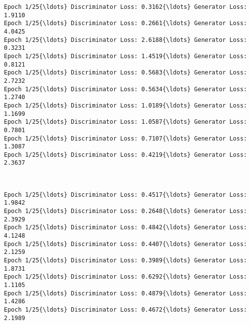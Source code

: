 \documentclass[11pt]{article}
\begin{document}
    \begin{Verbatim}[commandchars=\\\{\}]
Epoch 1/25{\ldots} Discriminator Loss: 0.3162{\ldots} Generator Loss: 1.9110
Epoch 1/25{\ldots} Discriminator Loss: 0.2661{\ldots} Generator Loss: 4.0425
Epoch 1/25{\ldots} Discriminator Loss: 2.6188{\ldots} Generator Loss: 0.3231
Epoch 1/25{\ldots} Discriminator Loss: 1.4519{\ldots} Generator Loss: 0.8121
Epoch 1/25{\ldots} Discriminator Loss: 0.5683{\ldots} Generator Loss: 2.7232
Epoch 1/25{\ldots} Discriminator Loss: 0.5634{\ldots} Generator Loss: 1.2740
Epoch 1/25{\ldots} Discriminator Loss: 1.0189{\ldots} Generator Loss: 1.1699
Epoch 1/25{\ldots} Discriminator Loss: 1.0587{\ldots} Generator Loss: 0.7801
Epoch 1/25{\ldots} Discriminator Loss: 0.7107{\ldots} Generator Loss: 1.3087
Epoch 1/25{\ldots} Discriminator Loss: 0.4219{\ldots} Generator Loss: 2.3637

    \end{Verbatim}

    \begin{center}
    \end{center}
    { \hspace*{\fill} \\}
    
    \begin{Verbatim}[commandchars=\\\{\}]
Epoch 1/25{\ldots} Discriminator Loss: 0.4517{\ldots} Generator Loss: 1.9842
Epoch 1/25{\ldots} Discriminator Loss: 0.2648{\ldots} Generator Loss: 2.3929
Epoch 1/25{\ldots} Discriminator Loss: 0.4842{\ldots} Generator Loss: 4.1248
Epoch 1/25{\ldots} Discriminator Loss: 0.4407{\ldots} Generator Loss: 2.1259
Epoch 1/25{\ldots} Discriminator Loss: 0.3989{\ldots} Generator Loss: 1.8731
Epoch 1/25{\ldots} Discriminator Loss: 0.6292{\ldots} Generator Loss: 1.1105
Epoch 1/25{\ldots} Discriminator Loss: 0.4879{\ldots} Generator Loss: 1.4286
Epoch 1/25{\ldots} Discriminator Loss: 0.4672{\ldots} Generator Loss: 2.1989

    \end{Verbatim}
\end{document}
